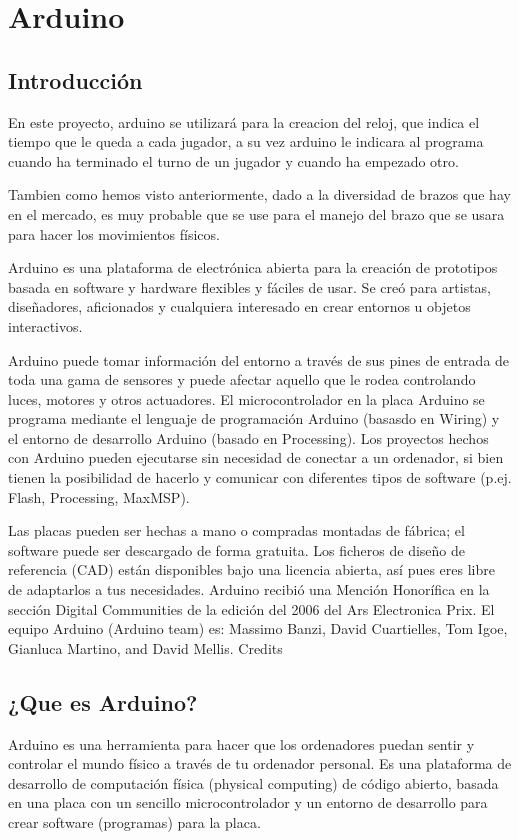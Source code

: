 \documentclass[12pt,a4paper]{report}
\begin{document}
\section{Arduino}
\subsection{Introducción}
En este proyecto, arduino se utilizará para la creacion del reloj, que indica el
tiempo que le queda a cada jugador, a su vez arduino le indicara al programa
cuando ha terminado el turno de un jugador y cuando ha empezado otro.

Tambien como hemos visto anteriormente, dado a la diversidad de brazos que hay
en el mercado, es muy probable que se use para el manejo del brazo que se usara
para hacer los movimientos físicos.

Arduino es una plataforma de electrónica abierta para la creación de prototipos
basada en software y hardware flexibles y fáciles de usar. Se creó para
artistas, diseñadores, aficionados y cualquiera interesado en crear entornos u
objetos interactivos.

Arduino puede tomar información del entorno a través de sus pines de entrada de
toda una gama de sensores y puede afectar aquello que le rodea controlando
luces, motores y otros actuadores. El microcontrolador en la placa Arduino se
programa mediante el lenguaje de programación Arduino (basasdo en Wiring) y el
entorno de desarrollo Arduino (basado en Processing). Los proyectos hechos con
Arduino pueden ejecutarse sin necesidad de conectar a un ordenador, si bien
tienen la posibilidad de hacerlo y comunicar con diferentes tipos de software
(p.ej. Flash, Processing, MaxMSP).

Las placas pueden ser hechas a mano o compradas montadas de fábrica; el software
puede ser descargado de forma gratuita. Los ficheros de diseño de referencia
(CAD) están disponibles bajo una licencia abierta, así pues eres libre de
adaptarlos a tus necesidades.
Arduino recibió una Mención Honorífica en la sección Digital Communities de la
edición del 2006 del Ars Electronica Prix. El equipo Arduino (Arduino team) es:
Massimo Banzi, David Cuartielles, Tom Igoe, Gianluca Martino, and David Mellis.
Credits

\subsection{¿Que es Arduino?}

Arduino es una herramienta para hacer que los ordenadores puedan sentir y
controlar el mundo físico a través de tu ordenador personal. Es una plataforma
de desarrollo de computación física (physical computing) de código abierto,
basada en una placa con un sencillo microcontrolador y un entorno de desarrollo
para crear software (programas) para la placa.
\end{document}
